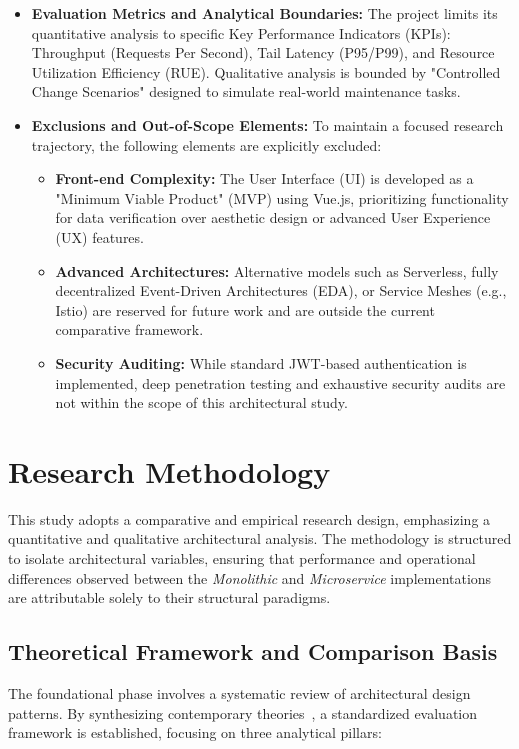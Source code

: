 \begin{itemize}
\item \textbf{Evaluation Metrics and Analytical Boundaries:} 
The project limits its quantitative analysis to specific Key Performance Indicators (KPIs): Throughput (Requests Per Second), Tail Latency (P95/P99), and Resource Utilization Efficiency (RUE). Qualitative analysis is bounded by "Controlled Change Scenarios" designed to simulate real-world maintenance tasks. 

\item \textbf{Exclusions and Out-of-Scope Elements:}
To maintain a focused research trajectory, the following elements are explicitly excluded:
\begin{itemize}
    \item \textbf{Front-end Complexity:} The User Interface (UI) is developed as a "Minimum Viable Product" (MVP) using Vue.js, prioritizing functionality for data verification over aesthetic design or advanced User Experience (UX) features.
    \item \textbf{Advanced Architectures:} Alternative models such as Serverless, fully decentralized Event-Driven Architectures (EDA), or Service Meshes (e.g., Istio) are reserved for future work and are outside the current comparative framework.
    \item \textbf{Security Auditing:} While standard JWT-based authentication is implemented, deep penetration testing and exhaustive security audits are not within the scope of this architectural study.
\end{itemize}
\end{itemize}

\section{Research Methodology}

This study adopts a comparative and empirical research design, emphasizing a quantitative and qualitative architectural analysis. The methodology is structured to isolate architectural variables, ensuring that performance and operational differences observed between the \textit{Monolithic} and \textit{Microservice} implementations are attributable solely to their structural paradigms.

\subsection{Theoretical Framework and Comparison Basis}

The foundational phase involves a systematic review of architectural design patterns. By synthesizing contemporary theories~\cite{IJNRD2023}, a standardized evaluation framework is established, focusing on three analytical pillars:

